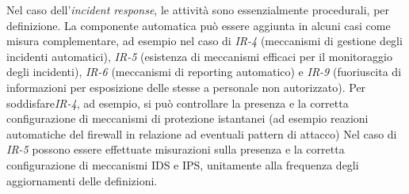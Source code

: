 Nel caso dell'\textit{incident response}, le attività sono essenzialmente procedurali, per definizione.
La componente automatica può essere aggiunta in alcuni casi come misura complementare, ad esempio nel caso di \textit{IR-4} (meccanismi di gestione degli incidenti automatici), \textit{IR-5} (esistenza di meccanismi efficaci per il monitoraggio degli incidenti), \textit{IR-6} (meccanismi di reporting automatico) e \textit{IR-9} (fuoriuscita di informazioni per esposizione delle stesse a personale non autorizzato). 
Per soddisfare\textit{IR-4}, ad esempio, si può controllare la presenza e la corretta configurazione di meccanismi di protezione istantanei (ad esempio reazioni automatiche del firewall in relazione ad eventuali pattern di attacco)
Nel caso di \textit{IR-5} possono essere effettuate misurazioni sulla presenza e la corretta configurazione di meccanismi IDS e IPS, unitamente alla frequenza degli aggiornamenti delle definizioni.
\vfill
\newpage
